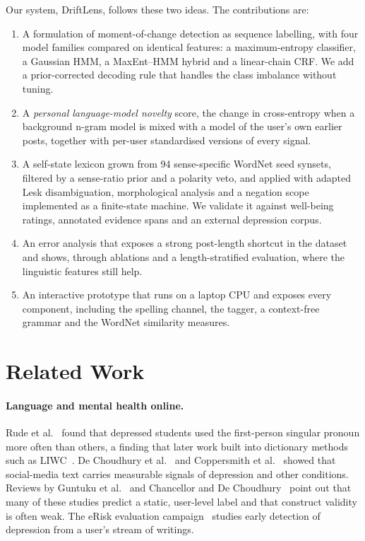 \documentclass[runningheads]{llncs}
\begin{document}
Our system, DriftLens, follows these two ideas. The contributions are:
\begin{enumerate}
\item A formulation of moment-of-change detection as sequence labelling, with four model families compared on identical features: a maximum-entropy classifier, a Gaussian HMM, a MaxEnt--HMM hybrid and a linear-chain CRF. We add a prior-corrected decoding rule that handles the class imbalance without tuning.
\item A \emph{personal language-model novelty} score, the change in cross-entropy when a background n-gram model is mixed with a model of the user's own earlier posts, together with per-user standardised versions of every signal.
\item A self-state lexicon grown from 94 sense-specific WordNet seed synsets, filtered by a sense-ratio prior and a polarity veto, and applied with adapted Lesk disambiguation, morphological analysis and a negation scope implemented as a finite-state machine. We validate it against well-being ratings, annotated evidence spans and an external depression corpus.
\item An error analysis that exposes a strong post-length shortcut in the dataset and shows, through ablations and a length-stratified evaluation, where the linguistic features still help.
\item An interactive prototype that runs on a laptop CPU and exposes every component, including the spelling channel, the tagger, a context-free grammar and the WordNet similarity measures.
\end{enumerate}

\section{Related Work}

\paragraph{Language and mental health online.}
Rude et al.~\cite{rude2004language} found that depressed students used the first-person singular pronoun more often than others, a finding that later work built into dictionary methods such as LIWC~\cite{tausczik2010psychological}. De Choudhury et al.~\cite{dechoudhury2013predicting} and Coppersmith et al.~\cite{coppersmith2014quantifying} showed that social-media text carries measurable signals of depression and other conditions. Reviews by Guntuku et al.~\cite{guntuku2017detecting} and Chancellor and De Choudhury~\cite{chancellor2020methods} point out that many of these studies predict a static, user-level label and that construct validity is often weak. The eRisk evaluation campaign~\cite{losada2016test,parapar2024erisk} studies early detection of depression from a user's stream of writings.
\end{document}
